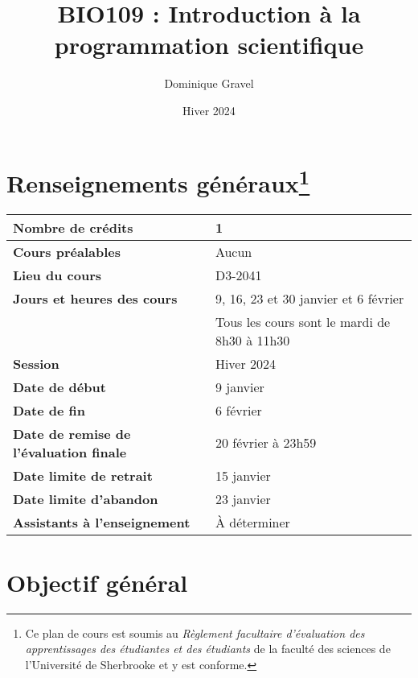 \documentclass[12]{article}
\title{BIO109 : Introduction à la programmation scientifique}
\date {Hiver 2024}
\author {Dominique Gravel}
\affil {Département de biologie \\
Université de Sherbrooke \\
Local D8-3066 \\
819-821-8000 \#66589}
\affil {\url{dominique.gravel@usherbrooke.ca}}
\begin{document}
	\maketitle

	\section*{Renseignements généraux\footnote{Ce plan de cours est soumis au \textit{Règlement facultaire d'évaluation des apprentissages des étudiantes et des étudiants} de la faculté des sciences de l'Université de Sherbrooke et y est conforme.}} 
        
        \begin{center}
        \begin{tabular}{ m{22em} m{24em} } 
         \hline
         \hline
         \textbf{Nombre de crédits} & 1 \\ 
         \hline
         \textbf{Cours préalables} & Aucun \\
         \hline
         \textbf{Lieu du cours} & D3-2041 \\
         \hline
         \textbf{Jours et heures des cours} & 9, 16, 23 et 30 janvier et 6 février \\ & Tous les cours sont le mardi de 8h30 à 11h30 \\
         \hline
         \textbf{Session} & Hiver 2024 \\
         \hline
         \textbf{Date de début} & 9 janvier \\
         \hline
         \textbf{Date de fin} & 6 février \\
         \hline
         \textbf{Date de remise de l'évaluation finale} & 20 février à 23h59 \\
         \hline
         \textbf{Date limite de retrait} & 15 janvier \\
         \hline
         \textbf{Date limite d'abandon} & 23 janvier \\
         \hline
         \textbf{Assistants à l'enseignement} & À déterminer \\
         \hline
         \hline
        \end{tabular}
        \end{center}
	
	\section*{Objectif général}
\end{document}

